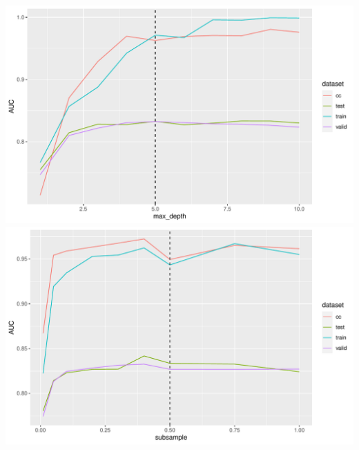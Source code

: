 \documentclass[12pt]{article}
\begin{document}
\begin{center}
\includegraphics[width=.9\textwidth]{best_aucs_tuning_max_depth.pdf}
\includegraphics[width=.9\textwidth]{best_aucs_tuning_subsample.pdf}
\end{center}
\end{document}
